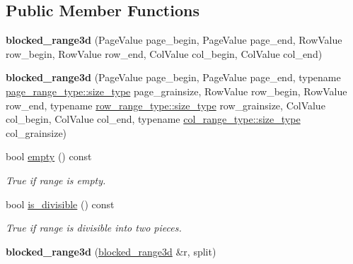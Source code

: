 \subsection*{Public Member Functions}
\begin{DoxyCompactItemize}
\item 
\hypertarget{classtbb_1_1blocked__range3d_aa5159e07e2d601319eece538edb8add0}{}{\bfseries blocked\+\_\+range3d} (Page\+Value page\+\_\+begin, Page\+Value page\+\_\+end, Row\+Value row\+\_\+begin, Row\+Value row\+\_\+end, Col\+Value col\+\_\+begin, Col\+Value col\+\_\+end)\label{classtbb_1_1blocked__range3d_aa5159e07e2d601319eece538edb8add0}

\item 
\hypertarget{classtbb_1_1blocked__range3d_a671a22033260fa02734c5a1113dcf1ac}{}{\bfseries blocked\+\_\+range3d} (Page\+Value page\+\_\+begin, Page\+Value page\+\_\+end, typename \hyperlink{classtbb_1_1blocked__range_a89b300cecd9d617e4ee801c786756e55}{page\+\_\+range\+\_\+type\+::size\+\_\+type} page\+\_\+grainsize, Row\+Value row\+\_\+begin, Row\+Value row\+\_\+end, typename \hyperlink{classtbb_1_1blocked__range_a89b300cecd9d617e4ee801c786756e55}{row\+\_\+range\+\_\+type\+::size\+\_\+type} row\+\_\+grainsize, Col\+Value col\+\_\+begin, Col\+Value col\+\_\+end, typename \hyperlink{classtbb_1_1blocked__range_a89b300cecd9d617e4ee801c786756e55}{col\+\_\+range\+\_\+type\+::size\+\_\+type} col\+\_\+grainsize)\label{classtbb_1_1blocked__range3d_a671a22033260fa02734c5a1113dcf1ac}

\item 
\hypertarget{classtbb_1_1blocked__range3d_aea992e0cd3d105f964a633b1a0a1a05f}{}bool \hyperlink{classtbb_1_1blocked__range3d_aea992e0cd3d105f964a633b1a0a1a05f}{empty} () const \label{classtbb_1_1blocked__range3d_aea992e0cd3d105f964a633b1a0a1a05f}

\begin{DoxyCompactList}\small\item\em True if range is empty. \end{DoxyCompactList}\item 
\hypertarget{classtbb_1_1blocked__range3d_a0fce6bcae6269c37623c3a2cdbb8bcf0}{}bool \hyperlink{classtbb_1_1blocked__range3d_a0fce6bcae6269c37623c3a2cdbb8bcf0}{is\+\_\+divisible} () const \label{classtbb_1_1blocked__range3d_a0fce6bcae6269c37623c3a2cdbb8bcf0}

\begin{DoxyCompactList}\small\item\em True if range is divisible into two pieces. \end{DoxyCompactList}\item 
\hypertarget{classtbb_1_1blocked__range3d_a788ebedfb4a2eaa4bee11c2c967e0768}{}{\bfseries blocked\+\_\+range3d} (\hyperlink{classtbb_1_1blocked__range3d}{blocked\+\_\+range3d} \&r, split)\label{classtbb_1_1blocked__range3d_a788ebedfb4a2eaa4bee11c2c967e0768}


\end{DoxyCompactItemize}
